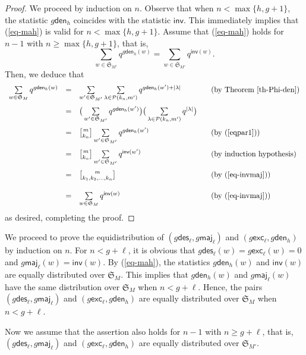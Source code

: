 \documentclass[12pt]{article}
\numberwithin{equation}{section}
\theoremstyle{plain}
\def\des{\mathsf{des}}
\def\maj{\mathsf{maj}}
\def\exc{\mathsf{exc}}
\def\den{\mathsf{den}}
\def\inv{\mathsf{inv}}
\begin{document}
\begin{proof}
	We proceed by induction on $n$. Observe that when $n<\max\{h, g+1\}$, 
 the statistic $g\den_{h}$ coincides with  the statistic $\inv$. This immediately implies that     (\ref{eq-mah}) is valid  for $ n<\max\{h, g+1\}$.       Assume that (\ref{eq-mah}) holds for $n-1$ with $n\geq \max\{h, g+1\} $, that is, 
	$$ \sum\limits_{w\in \mathfrak{S}_{M'}}q^{g\den_h(w)}=\sum\limits_{w\in \mathfrak{S}_{M'}}q^{\inv(w)}.$$
	Then, we deduce that
	$$
	\begin{array}{llll}
		\sum\limits_{w\in \mathfrak{S}_{M}}q^{g\den_h(w)}&=& \sum\limits_{w'\in \mathfrak{S}_{M'}}\sum\limits_{\lambda\in \mathcal{P}(k_n, m')}q^{g\den_{h}(w')+|\lambda|}&\,\,\, \,\,\mbox{(by Theorem \ref{th-Phi-den})}\\
		 [1.5em]
		&=&\big( \sum\limits_{w'\in \mathfrak{S}_{M'}}q^{g\den_{h}(w')}\big) \big(\sum\limits_{\lambda\in \mathcal{P}(k_n, m')}q^{ |\lambda|}\big)&\\
	 [1.5em]
		&=& {m\brack k_n}\sum\limits_{w'\in \mathfrak{S}_{M'}}q^{g\den_{h}(w')} & \,\,\, \,\,\mbox{(by  (\ref{eqpar1}))}\\
	  [1.5em]
		&=& {m\brack k_n} \sum\limits_{w'\in \mathfrak{S}_{M'}}q^{\inv(w')} & \,\,\, \,\,\mbox{(by  induction hypothesis)}\\
		  [1.5em]
			&=& {m\brack k_1,k_2,\ldots,k_n} & \,\,\, \,\,\mbox{(by  (\ref{eq-invmaj}))}\\
			 [1.5em]
				&=& \sum\limits_{w\in \mathfrak{S}_{M}}q^{\inv(w)}  & \,\,\, \,\,\mbox{(by  (\ref{eq-invmaj}))}\\
		\end{array}
	$$
	as desired, completing the proof. 
	\end{proof}

 We proceed to prove the equidistribution of $(g\des_{\ell}, g\maj_{\ell})$ and $(g\exc_{\ell}, g\den_{h})$ by induction on $n$.   
 For  $n<g+\ell$,  it is obvious that    $g\des_\ell(w)=g\exc_\ell(w)=0$  and $g\maj_{\ell}(w)=\inv(w)$.   By (\ref{eq-mah}),  the statistics $g\den_{h}(w)$  and $\inv(w)$ are equally distributed over $\mathfrak{S}_{M}$.  This implies that  $g\den_{h}(w)$   and   $g\maj_{\ell}(w)$ have the same distribution over $\mathfrak{S}_{M}$ when $n<g+\ell$. Hence,  the pairs $(g\des_{\ell}, g\maj_{\ell})$ and $(g\exc_{\ell}, g\den_{h})$ are equally distributed over $\mathfrak{S}_{M}$ when $n<g+\ell$.   
 
 Now we assume that  the assertion also holds for  $n-1$ with $n\geq g+\ell$, that is, $(g\des_{\ell}, g\maj_{\ell})$ and $(g\exc_{\ell}, g\den_{h})$ are equally distributed over $\mathfrak{S}_{M'}$. 
  
\end{document}
